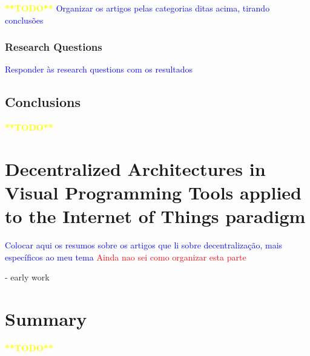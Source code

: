 \textcolor{yellow}{\textbf{**TODO**}}
\textcolor{blue}{Organizar os artigos pelas categorias ditas acima, tirando conclusões}

\subsubsection{Research Questions}

\textcolor{blue}{Responder às research questions com os resultados}

\subsection{Conclusions}

\textcolor{yellow}{\textbf{**TODO**}}

\section{Decentralized Architectures in Visual Programming Tools applied to the Internet of Things paradigm}

\textcolor{blue}{Colocar aqui os resumos sobre os artigos que li sobre decentralização, mais específicos ao meu tema}
\textcolor{red}{Ainda nao sei como organizar esta parte}


\cite{ddf}
\cite{ddflow}

\cite{wotflow_dnr} - early work
\cite{fog_at_the_edge}
\cite{exogenous_coordination}
\cite{flow_based_programming_fog}
\cite{fog_flow}
\cite{fog_flow_orchestration}
\cite{fog_computing_book}


\section{Summary}

\textcolor{yellow}{\textbf{**TODO**}}

